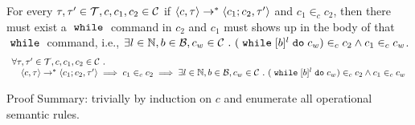 %
\begin{lem}
	\label{lem:inv_while}
	For every $\mathtt{\tau}, \mathtt{\tau}' \in \mathcal{T}, c, c_1, c_2 \in \mathcal{C}$ 
	if $ \langle c, \mathtt{\tau} \rangle \rightarrow^* \langle c_1; c_2, \mathtt{\tau}' \rangle$ and 
	$c_1 \in_c c_2$, 
	then there must exist a $\;\mathtt{while}\;$ command in $c_2$ and $c_1$ must shows up in the body of that $\;\mathtt{while}\;$ command,
	 i.e., $\exists l \in \mathbb{N}, b \in \mathcal{B}, c_w \in \mathcal{C} ~.~   
	(\;\mathtt{while}\; [b]^l \;\mathtt{do}\; c_w) \in_c c_2 \land c_1 \in_c c_w$.
	\[
	\begin{array}{l}
	\forall \mathtt{\tau}, \mathtt{\tau}' \in \mathcal{T}, c, c_1, c_2 \in \mathcal{C} ~.~  
		\\ \quad
		\langle c, \mathtt{\tau} \rangle \rightarrow^* \langle c_1; c_2, \mathtt{\tau}' \rangle
		\implies
		c_1 \in_c c_2
		\implies
		\exists l \in \mathbb{N}, b \in \mathcal{B}, c_w \in \mathcal{C} ~.~   
		(\;\mathtt{while}\; [b]^l \;\mathtt{do}\; c_w) \in_c c_2 \land c_1 \in_c c_w
	\end{array}
	\]
	\end{lem}	
	Proof Summary: trivially by induction on $c$ and enumerate all operational semantic rules.
